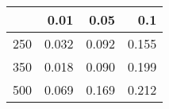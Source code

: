 % 
\begin{tabular}{rrrr}
  \hline
 & 0.01 & 0.05 & 0.1 \\ 
  \hline
250 & 0.032 & 0.092 & 0.155 \\ 
  350 & 0.018 & 0.090 & 0.199 \\ 
  500 & 0.069 & 0.169 & 0.212 \\ 
   \hline
\end{tabular}
